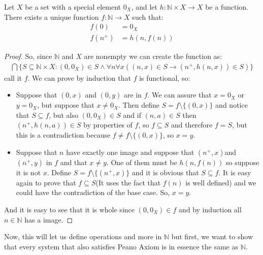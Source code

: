 \documentclass{tufte-handout}
\begin{document}
\begin{theorem}
	Let $X$ be a set with a special element $0_X$, and let $h: \mathbb{N} \times X \to X$ be a function. There exists a unique function $f: \mathbb{N} \to X$ such that:
	\begin{align*}
		f(0) &= 0_X\\
		f(n^+) &= h(n, f(n))
	\end{align*}
\end{theorem}
\begin{proof}
	So, since $\mathbb{N}$ and $X$ are nonempty we can create the function as:
	\begin{align*}
		\bigcap\{S \subseteq \mathbb{N} \times X: (0, 0_X) \in S \wedge \forall n \forall x((n, x) \in S \rightarrow (n^+, h(n, x)) \in S)\}
	\end{align*}
	call it $f$. We can prove by induction that $f$ is functional, so:
	\begin{itemize}
		\item Suppose that $(0, x)$ and $(0, y)$ are in $f$. We can assure that $x = 0_X$ or $y = 0_X$, but suppose that $x \neq 0_X$. Then define $S = f\setminus \{(0, x)\}$ and notice that $S \subseteq f$, but also $(0, 0_X) \in S$ and if $(n, a) \in S$ then $(n^+, h(n, a)) \in S$ by properties of $f$, so $f \subseteq S$ and therefore $f = S$, but this is a contradiction because $f \neq f \setminus \{(0, x)\}$, so $ x = y$.
		\item Suppose that $n$ have exactly one image and suppose that $(n^+, x)$and $(n^+, y)$ in $f$ and that $x \neq y$. One of them must be $h(n, f(n))$ so suppose it is not $x$. Define $S = f \setminus \{(n^+, x)\}$ and it is obvious that $S \subseteq f$. It is easy again to prove that $f \subseteq S$(It uses the fact that $f(n)$ is well defined) and we could have the contradiction of the base case. So, $x = y$.
	\end{itemize}
	And it is easy to see that it is whole since $(0, 0_X) \in f$ and by induction all $n \in \mathbb{N}$ has a image.
\end{proof}

Now, this will let us define operations and more in $\mathbb{N}$ but first, we want to show that every system that also satisfies Peano Axiom is in essence the same as $\mathbb{N}$.
\end{document}
